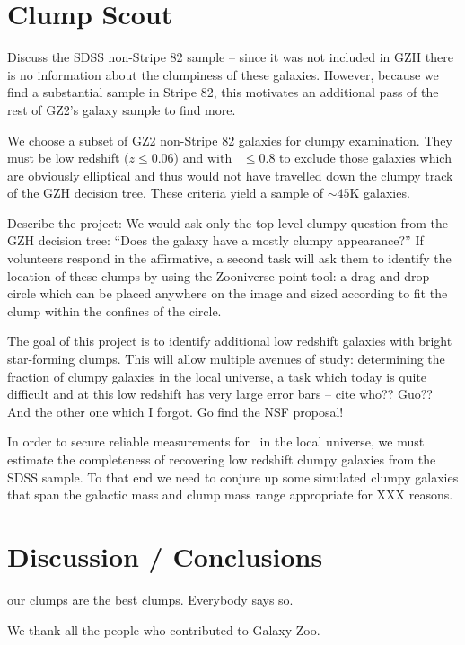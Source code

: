 \section{Clump Scout}
Discuss the SDSS non-Stripe 82 sample -- since it was not included in GZH there is no information about the clumpiness of these galaxies. However, because we find a substantial sample in Stripe 82, this motivates an additional pass of the rest of GZ2's galaxy sample to find more. 

We choose a subset of GZ2 non-Stripe 82 galaxies for clumpy examination. They must be low redshift ($z\le0.06$) and with \fsmooth~$\le0.8$ to exclude those galaxies which are obviously elliptical and thus would not have travelled down the clumpy track of the GZH decision tree. These criteria yield a sample of $\sim45$K galaxies. 

Describe the project: We would ask only the top-level clumpy question from the GZH decision tree: ``Does the galaxy have a mostly clumpy appearance?'' If volunteers respond in the affirmative, a second task will ask them to identify the location of these clumps by using the Zooniverse point tool: a drag and drop circle which can be placed anywhere on the image and sized according to fit the clump within the confines of the circle. 

The goal of this project is to identify additional low redshift galaxies with bright star-forming clumps. This will allow multiple avenues of study: determining the fraction of clumpy galaxies in the local universe, a task which today is quite difficult and at this low redshift has very large error bars -- cite who?? Guo?? And the other one which I forgot. Go find the NSF proposal!

In order to secure reliable measurements for \fclump~in the local universe, we must estimate the completeness of recovering low redshift clumpy galaxies from the SDSS sample. To that end we need to conjure up some simulated clumpy galaxies that span the galactic mass and clump mass range appropriate for XXX reasons. 


\section{Discussion / Conclusions}
our clumps are the best clumps. Everybody says so. 


We thank all the people who contributed to Galaxy Zoo. 